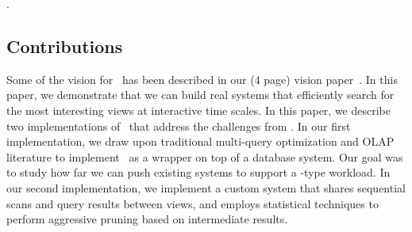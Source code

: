 .

\subsection*{Contributions}
Some of the vision for \SeeDB\ has been described in our (4 page) vision paper~\cite{DBLP:conf/vldb/Parameswaran2013}.
In this paper, we demonstrate that we can build real systems that efficiently search for the most
interesting views at interactive time scales.
In this paper, we describe two implementations of \SeeDB\ that address the challenges from \cite{DBLP:conf/vldb/Parameswaran2013}.
In our first implementation, we draw upon traditional multi-query optimization and OLAP literature to implement \SeeDB\ 
as a wrapper on top of a database system. Our goal was to study how far we can push existing systems to support a
\SeeDB-type workload.
In our second implementation, we implement a custom system that  shares sequential scans and query results between views, and 
employs statistical techniques to perform aggressive pruning based on intermediate results.

